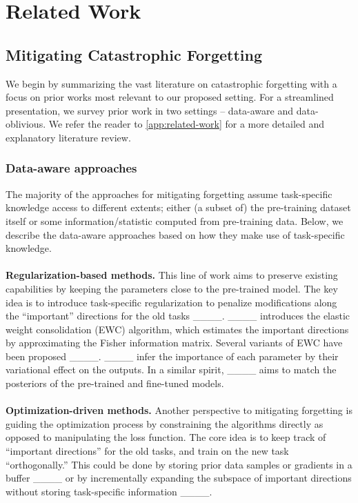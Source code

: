 \section{Related Work}
\label{sec:related-work}
\subsection{Mitigating Catastrophic Forgetting}
We begin by summarizing the vast literature on catastrophic forgetting with a focus on prior works most relevant to our proposed setting.
For a streamlined presentation, we survey prior work in two settings -- data-aware and data-oblivious. 
We refer the reader to \cref{app:related-work} for a more detailed and explanatory literature review. 

\subsubsection{Data-aware approaches}
The majority of the approaches for mitigating  
forgetting assume task-specific knowledge access to different extents; either (a subset of) the pre-training dataset itself or some information/statistic computed from pre-training data. Below, we describe the data-aware approaches based on how they make use of task-specific knowledge.
\\
\\
\textbf{Regularization-based methods.} This line of work aims to preserve existing capabilities by keeping the parameters close to the pre-trained model. The key idea is to introduce task-specific regularization to penalize modifications along the ``important'' directions for the old tasks 
____. 
____ introduces the elastic weight consolidation (EWC) algorithm, which estimates the important directions by approximating the Fisher information matrix. 
Several variants of EWC have been proposed ____. ____ infer the importance of each parameter by their variational effect on the outputs. In a similar spirit, ____ aims to match the posteriors of the pre-trained and fine-tuned models. 
\\
\\
\textbf{Optimization-driven methods.} Another perspective to mitigating forgetting is guiding the optimization process by constraining the algorithms directly as opposed to manipulating the loss function. 
The core idea is to keep track of \enquote{important directions} for the old tasks, and train on the new task \enquote{orthogonally.} 
This could be done by storing prior data samples or gradients in a buffer ____ or by incrementally expanding the subspace of important directions without storing task-specific information ____.
